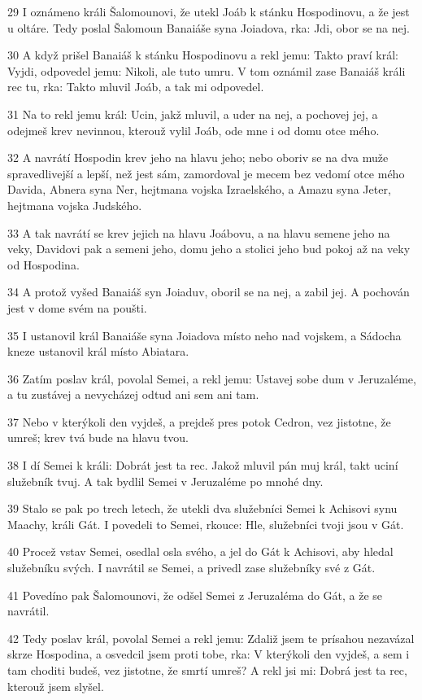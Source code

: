 \par 29 I oznámeno králi Šalomounovi, že utekl Joáb k stánku Hospodinovu, a že jest u oltáre. Tedy poslal Šalomoun Banaiáše syna Joiadova, rka: Jdi, obor se na nej.
\par 30 A když prišel Banaiáš k stánku Hospodinovu a rekl jemu: Takto praví král: Vyjdi, odpovedel jemu: Nikoli, ale tuto umru. V tom oznámil zase Banaiáš králi rec tu, rka: Takto mluvil Joáb, a tak mi odpovedel.
\par 31 Na to rekl jemu král: Ucin, jakž mluvil, a uder na nej, a pochovej jej, a odejmeš krev nevinnou, kterouž vylil Joáb, ode mne i od domu otce mého.
\par 32 A navrátí Hospodin krev jeho na hlavu jeho; nebo oboriv se na dva muže spravedlivejší a lepší, než jest sám, zamordoval je mecem bez vedomí otce mého Davida, Abnera syna Ner, hejtmana vojska Izraelského, a Amazu syna Jeter, hejtmana vojska Judského.
\par 33 A tak navrátí se krev jejich na hlavu Joábovu, a na hlavu semene jeho na veky, Davidovi pak a semeni jeho, domu jeho a stolici jeho bud pokoj až na veky od Hospodina.
\par 34 A protož vyšed Banaiáš syn Joiaduv, oboril se na nej, a zabil jej. A pochován jest v dome svém na poušti.
\par 35 I ustanovil král Banaiáše syna Joiadova místo neho nad vojskem, a Sádocha kneze ustanovil král místo Abiatara.
\par 36 Zatím poslav král, povolal Semei, a rekl jemu: Ustavej sobe dum v Jeruzaléme, a tu zustávej a nevycházej odtud ani sem ani tam.
\par 37 Nebo v kterýkoli den vyjdeš, a prejdeš pres potok Cedron, vez jistotne, že umreš; krev tvá bude na hlavu tvou.
\par 38 I dí Semei k králi: Dobrát jest ta rec. Jakož mluvil pán muj král, takt uciní služebník tvuj. A tak bydlil Semei v Jeruzaléme po mnohé dny.
\par 39 Stalo se pak po trech letech, že utekli dva služebníci Semei k Achisovi synu Maachy, králi Gát. I povedeli to Semei, rkouce: Hle, služebníci tvoji jsou v Gát.
\par 40 Procež vstav Semei, osedlal osla svého, a jel do Gát k Achisovi, aby hledal služebníku svých. I navrátil se Semei, a privedl zase služebníky své z Gát.
\par 41 Povedíno pak Šalomounovi, že odšel Semei z Jeruzaléma do Gát, a že se navrátil.
\par 42 Tedy poslav král, povolal Semei a rekl jemu: Zdaliž jsem te prísahou nezavázal skrze Hospodina, a osvedcil jsem proti tobe, rka: V kterýkoli den vyjdeš, a sem i tam choditi budeš, vez jistotne, že smrtí umreš? A rekl jsi mi: Dobrá jest ta rec, kterouž jsem slyšel.
